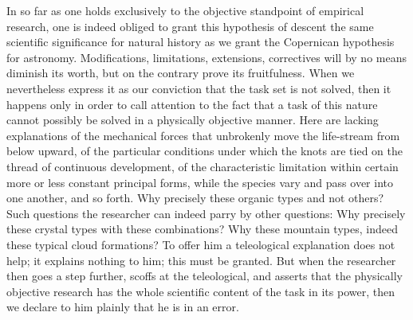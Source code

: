 \documentclass[12pt]{book}
\begin{document}
In so far as one holds exclusively to the objective standpoint of empirical research, one is
indeed obliged to grant this hypothesis of descent the same scientific significance for
natural history as we grant the Copernican hypothesis for astronomy. Modifications,
limitations, extensions, correctives will by no means diminish its worth, but on the
contrary prove its fruitfulness. When we nevertheless express it as our conviction that the
task set is not solved, then it happens only in order to call attention to the fact that a
task of this nature cannot possibly be solved in a physically objective manner. Here are
lacking explanations of the mechanical forces that unbrokenly move the life-stream from
below upward, of the particular conditions under which the knots are tied on the thread of
continuous development, of the characteristic limitation within certain more or less
constant principal forms, while the species vary and pass over into one another, and so
forth. Why precisely these organic types and not others? Such questions the researcher can
indeed parry by other questions: Why precisely these crystal types with these combinations?
Why these mountain types, indeed these typical cloud formations? To offer him a teleological
explanation does not help; it explains nothing to him; this must be granted. But when the
researcher then goes a step further, scoffs at the teleological, and asserts that the
physically objective research has the whole scientific content of the task in its power,
then we declare to him plainly that he is in an error.
\end{document}
